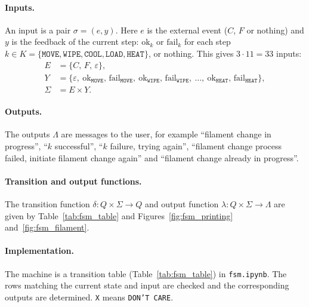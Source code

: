 \paragraph{Inputs.} An input is a pair $\sigma = (e, y)$. Here $e$ is the external event ($C$, $F$ or nothing) and $y$ is the feedback of the current step: $\mathrm{ok}_k$ or $\mathrm{fail}_k$ for each step $k \in K = \{\texttt{MOVE}, \texttt{WIPE}, \texttt{COOL}, \texttt{LOAD}, \texttt{HEAT}\}$, or nothing. This gives $3 \cdot 11 = 33$ inputs:
\begin{equation}
\label{eq:fsm_inputs}
\begin{aligned}
E &= \{C,\, F,\, \varepsilon\}, \\
Y &= \{\varepsilon,\ \mathrm{ok}_{\texttt{MOVE}},\, \mathrm{fail}_{\texttt{MOVE}},\ \mathrm{ok}_{\texttt{WIPE}},\, \mathrm{fail}_{\texttt{WIPE}},\ \dots,\ \mathrm{ok}_{\texttt{HEAT}},\, \mathrm{fail}_{\texttt{HEAT}}\}, \\
\Sigma &= E \times Y.
\end{aligned}
\end{equation}

\paragraph{Outputs.} The outputs $\Lambda$ are messages to the user, for example ``filament change in progress'', ``$k$ successful'', ``$k$ failure, trying again'', ``filament change process failed, initiate filament change again'' and ``filament change already in progress''.

\paragraph{Transition and output functions.} The transition function $\delta : Q \times \Sigma \to Q$ and output function $\lambda : Q \times \Sigma \to \Lambda$ are given by Table~\ref{tab:fsm_table} and Figures~\ref{fig:fsm_printing} and~\ref{fig:fsm_filament}.

\paragraph{Implementation.} The machine is a transition table (Table~\ref{tab:fsm_table}) in \texttt{fsm.ipynb}. The rows matching the current state and input are checked and the corresponding outputs are determined. \texttt{X} means \texttt{DON'T CARE}.

